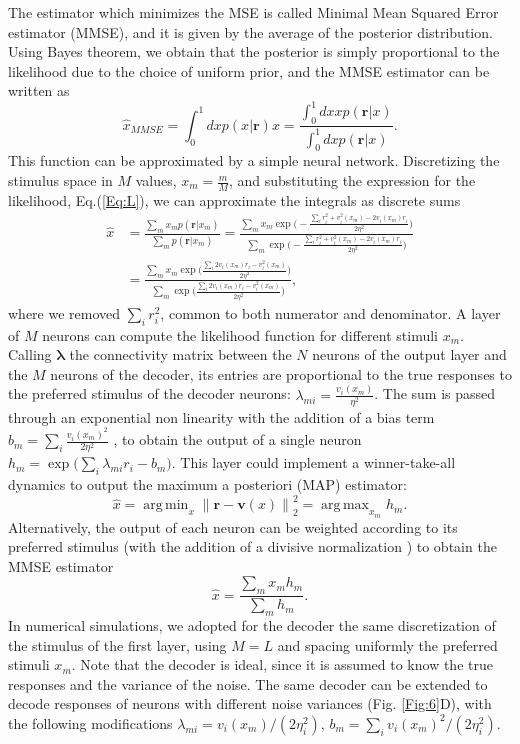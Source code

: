 \documentclass[a4paper]{article}
\DeclareMathOperator*{\argmin}{arg\,min}
\DeclareMathOperator*{\argmax}{arg\,max}
\begin{document}
The estimator which minimizes the MSE is called Minimal Mean Squared Error estimator (MMSE), and it is given by the average of the posterior distribution. Using Bayes theorem, we obtain that the posterior is simply proportional to the likelihood due to the choice of uniform prior, and the MMSE estimator can be written as
\begin{equation}
\hat{x}_{MMSE} = \int_0^1  dx   p(x| \textbf{r}) x = \frac{\int_0^1 dx x p(\mathbf{r}|x)}{\int_0^1 dx p(\mathbf{r}|x)}.
\end{equation}This function can be approximated by a simple neural network. Discretizing the stimulus space in $M$ values, $x_m = \frac{m}{M}$,  and substituting the expression for the likelihood, Eq.(\ref{Eq:L}), we can approximate the integrals as discrete sums
\begin{equation}
\begin{split}
\hat{x} &=  \frac{\sum_{m} x_m p(\mathbf{r}|x_m)}{\sum_{m} p(\mathbf{r}|x_m)} = \frac{\sum_m x_m \exp{\Big(-\frac{\sum_i r_i^2 + v_i^2(x_m) - 2v_i(x_m)r_i}{2\eta^2}}\Big)}{\sum_{m} \exp{\Big(-\frac{\sum_i r_i^2 + v_i^2(x_m) - 2v_i(x_m)r_i}{2\eta^2}}\Big)} \\
 & = \frac{\sum_{m} x_m \exp{\Big(\frac{\sum_i 2v_i(x_m)r_i-v_i^2(x_m) }{2\eta^2}}\Big)}{\sum_{m} \exp{\Big(\frac{\sum_i 2v_i(x_m)r_i-v_i^2(x_m) }{2\eta^2}}\Big)},
 \end{split}
\end{equation}where we removed $\sum_i r_i^2 $, common to both numerator and denominator.
A layer of $M$ neurons can compute the likelihood function for different stimuli $x_m$. Calling $\mathbf{\lambda}$ the connectivity matrix between the $N$ neurons of the output layer and the $M$ neurons of the decoder, its entries are proportional to the true responses to the preferred stimulus of the decoder neurons: $\lambda_{mi} = \frac{v_i(x_m)}{\eta^2}$.  The sum is passed through an exponential non linearity  with the addition of a bias term $b_m = \sum_i \frac{v_i(x_m)^2}{2\eta^2}$ , to obtain the output of a single neuron  $h_m = \exp{\Big(\sum_i \lambda_{mi}r_i - b_m\Big)}$. 
This layer could implement a winner-take-all dynamics to output the maximum a posteriori (MAP) estimator:
\begin{equation}
\hat{x} = \argmin_x \left\lVert\mathbf{r}-\mathbf{v}(x)\right\rVert_2^2 = \argmax_{x_m}h_m.
\label{Eq:ML}
\end{equation}
Alternatively, the output of each neuron can be weighted according to its preferred stimulus (with the addition of a divisive normalization ) to obtain the MMSE estimator
 \begin{equation}
\hat{x} = \frac{\sum_m x_m h_m}{\sum_m h_m}.
\label{Eq:Dec}
\end{equation}
In numerical simulations, we adopted for the decoder  the same discretization of the stimulus of the first layer, using $M=L$ and spacing uniformly the preferred stimuli $x_m$. Note that the decoder is ideal, since it is assumed to know the true responses and the variance of the noise. The same decoder can be extended to decode responses of neurons with different noise variances (Fig. \ref{Fig:6}D), with the following  modifications $\lambda_{mi} = v_i(x_m)/(2\eta_i^2)$,  $b_m = \sum_i v_i(x_m)^2/(2\eta_i^2)$.  
\end{document}
